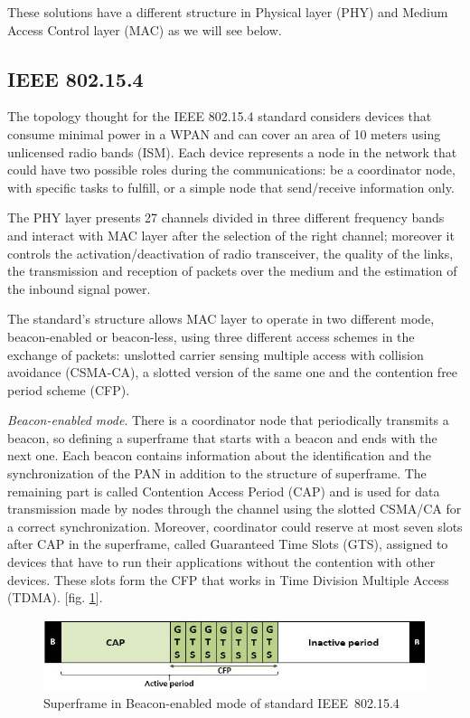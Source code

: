 \documentclass[conference]{IEEEtran}
\begin{document}
These solutions have a different structure in Physical layer (PHY) and Medium Access Control layer (MAC) as we will see below.


\subsection{IEEE 802.15.4}
The topology thought for the IEEE 802.15.4 standard considers devices that consume minimal power in a WPAN and can cover an area of 10 meters using unlicensed radio bands (ISM). Each device represents a node in the network that could have two possible roles during the communications: be a coordinator node, with specific tasks to fulfill, or a simple node that send/receive information only. 

The PHY layer presents 27 channels divided in three different frequency bands and interact with MAC layer after the selection of the right channel; moreover it controls the activation/deactivation of radio transceiver, the quality of the links, the transmission and reception of packets over the medium and the estimation of the inbound signal power.

The standard's structure allows MAC layer to operate in two different mode, beacon-enabled or beacon-less, using three different access schemes in the exchange of packets: unslotted carrier sensing multiple access with collision avoidance (CSMA-CA), a slotted version of the same one and the contention free period scheme (CFP).
\newline

\textit{Beacon-enabled mode}. There is a coordinator node that periodically transmits a beacon, so defining a superframe that starts with a beacon and ends with the next one. Each beacon contains information about the identification and the synchronization of the PAN in addition to the structure of superframe. The remaining part is called Contention Access Period (CAP) and is used for data transmission made by nodes through the channel using the slotted CSMA/CA for a correct synchronization. Moreover, coordinator could reserve at most seven slots after CAP in the superframe, called Guaranteed Time Slots (GTS), assigned to devices that have to run their applications without the contention with other devices. These slots form the CFP that works in Time Division Multiple Access (TDMA). [fig. \ref{fig_beaconenabled}].

\begin{figure}[htbp]
	\centering
	\includegraphics[width=0.9\linewidth]{img/beaconSuperframe.jpg}
	\caption{Superframe in Beacon-enabled mode of standard IEEE~802.15.4}
	\label{fig_beaconenabled}
\end{figure}
\end{document}
